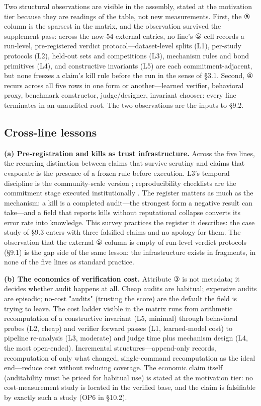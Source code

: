 \documentclass[11pt,a4paper]{article}
\begin{document}
Two structural observations are visible in the assembly, stated at the motivation tier because they are readings of the table, not new measurements. First, the ⑤ column is the sparsest in the matrix, and the observation survived the supplement pass: across the now-54 external entries, no line's ⑤ cell records a run-level, pre-registered verdict protocol—dataset-level splits (L1), per-study protocols (L2), held-out sets and competitions (L3), mechanism rules and bond primitives (L4), and constructive invariants (L5) are each commitment-adjacent, but none freezes a claim's kill rule before the run in the sense of §3.1. Second, ④ recurs across all five rows in one form or another—learned verifier, behavioral proxy, benchmark constructor, judge/designer, invariant chooser: every line terminates in an unaudited root. The two observations are the inputs to §9.2.

\subsection{Cross-line lessons}

\textbf{(a) Pre-registration and kills as trust infrastructure.} Across the five lines, the recurring distinction between claims that survive scrutiny and claims that evaporate is the presence of a frozen rule before execution. L3's temporal discipline is the community-scale version \cite{key07,key08}; reproducibility checklists are the commitment stage executed institutionally \cite{key08}. The register matters as much as the mechanism: a kill is a completed audit—the strongest form a negative result can take—and a field that reports kills without reputational collapse converts its error rate into knowledge. This survey practices the register it describes: the case study of §9.3 enters with three falsified claims and no apology for them. The observation that the external ⑤ column is empty of run-level verdict protocols (§9.1) is the gap side of the same lesson: the infrastructure exists in fragments, in none of the five lines as standard practice.

\textbf{(b) The economics of verification cost.} Attribute ③ is not metadata; it decides whether audit happens at all. Cheap audits are habitual; expensive audits are episodic; no-cost "audits" (trusting the score) are the default the field is trying to leave. The cost ladder visible in the matrix runs from arithmetic recomputation of a constructive invariant (L5, minimal) through behavioral probes (L2, cheap) and verifier forward passes (L1, learned-model cost) to pipeline re-analysis (L3, moderate) and judge time plus mechanism design (L4, the most open-ended). Incremental structures—append-only records, recomputation of only what changed, single-command recomputation as the ideal end—reduce cost without reducing coverage. The economic claim itself (auditability must be priced for habitual use) is stated at the motivation tier: no cost-measurement study is located in the verified base, and the claim is falsifiable by exactly such a study (OP6 in §10.2).
\end{document}
